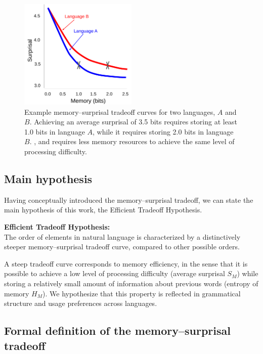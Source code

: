 \begin{figure}
\centering
\includegraphics[width=0.5\textwidth]{figures-gdrive/tradeoff-schematic.pdf}
	\caption{Example memory--surprisal tradeoff curves for two languages, $A$ and $B$. Achieving an average surprisal of 3.5 bits requires storing at least 1.0 bits in language $A$, while it requires storing 2.0 bits in language $B$. , and requires less memory resources to achieve the same level of processing difficulty.}
\label{fig:examples}
\end{figure}

\subsection{Main hypothesis}

Having conceptually introduced the memory--surprisal tradeoff, we can state the main hypothesis of this work, the Efficient Tradeoff Hypothesis.

\begin{adjustwidth}{6em}{6em}
\textbf{Efficient Tradeoff Hypothesis:}\\
The order of elements in natural language is characterized by a distinctively steeper memory--surprisal tradeoff curve, compared to other possible orders.
\end{adjustwidth}
A steep tradeoff curve corresponds to memory efficiency, in the sense that it is possible to achieve a low level of processing difficulty (average surprisal $S_M$) while storing a relatively small amount of information about previous words (entropy of memory $H_M$).
We hypothesize that this property is reflected in grammatical structure and usage preferences across languages.


\subsection{Formal definition of the memory--surprisal tradeoff}
\label{sec:formal-tradeoff}

